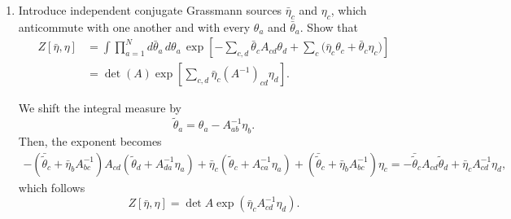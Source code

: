\begin{enumerate}[label=\alph*)]
    \item Introduce independent conjugate Grassmann sources $\bar\eta_c$ and
    $\eta_c$, which anticommute with one another and with every $\theta_a$ and
    $\bar\theta_a$. Show that
    \begin{equation}
        \begin{aligned}
        Z[\bar\eta,\eta]
        &=\int \prod_{a=1}^{N}d\bar\theta_a\,d\theta_a\,
        \exp\!\left[
            -\sum_{c,d}\bar\theta_cA_{cd}\theta_d
            +\sum_c\bigl(\bar\eta_c\theta_c+\bar\theta_c\eta_c\bigr)
        \right] \\
        &=\det(A)\exp\!\left[
            \sum_{c,d}\bar\eta_c(A^{-1})_{cd}\eta_d
        \right].
        \end{aligned}
    \end{equation}
    \begin{solution}
        We shift the integral measure by
        \begin{equation}
            \tilde{\theta}_a = \theta_a - A_{ab}^{-1}\eta_b.
        \end{equation}
        Then, the exponent becomes
        \begin{equation}
            \begin{aligned}
                -(\bar{\tilde{\theta}}_c + \bar{\eta}_bA_{bc}^{-1})A_{cd}(\tilde{\theta}_d + A_{da}^{-1}\eta_a) + \bar{\eta}_c(\tilde{\theta}_c + A_{ca}^{-1}\eta_a) + (\bar{\tilde{\theta}}_c + \bar{\eta}_bA_{bc}^{-1})\eta_c = -\bar{\tilde{\theta}}_cA_{cd}\tilde{\theta}_d+\bar{\eta}_cA_{cd}^{-1}\eta_d,
            \end{aligned}
        \end{equation}
        which follows
        \begin{equation}
            Z[\bar{\eta},\eta] = \det A \exp(\bar{\eta}_cA_{cd}^{-1}\eta_d).
        \end{equation}
    \end{solution}


\end{enumerate}
